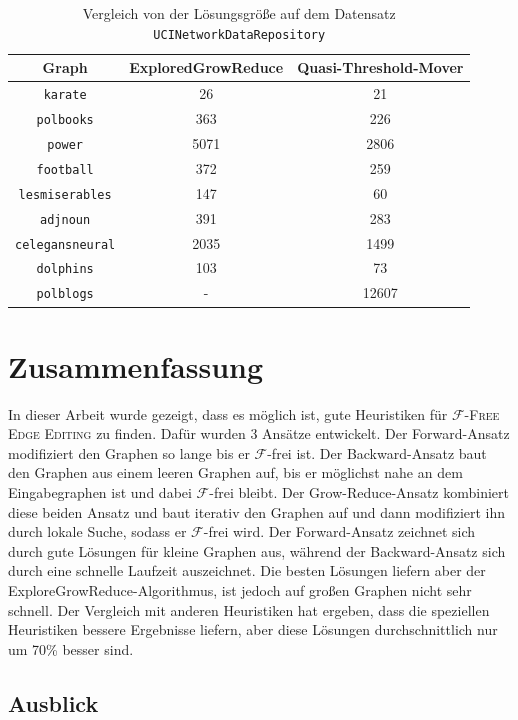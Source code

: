 \documentclass[12pt,a4paper,onecolumn,oneside,titlepage]{article}
\newcommand{\vars}{\texttt}
\newcommand\cursive[1]{\ensuremath{\mathcal{#1}}}
\begin{document}
\begin{table}
\centering
\begin{tabular}{c cc}
Graph & \textbf{ExploredGrowReduce} & \textbf{Quasi-Threshold-Mover} \\ 
\hline 
\vars{karate} & 26 & 21 \\
\vars{polbooks} & 363 & 226 \\
\vars{power} & 5071 & 2806 \\
\vars{football} & 372 & 259 \\
\vars{lesmiserables} & 147 & 60 \\
\vars{adjnoun} & 391 & 283\\
\vars{celegansneural} & 2035 & 1499 \\
\vars{dolphins} & 103 & 73 \\
\vars{polblogs} & - & 12607 \\
\end{tabular} 
\caption{Vergleich von der Lösungsgröße auf dem Datensatz \vars{UCINetworkDataRepository}}
\label{tab:uci}
\end{table}


\section{Zusammenfassung}
In dieser Arbeit wurde gezeigt, dass es möglich ist, gute Heuristiken für \textsc{\cursive{F}-Free Edge Editing} zu finden. Dafür wurden 3 Ansätze entwickelt. Der Forward-Ansatz modifiziert den Graphen so lange bis er \cursive{F}-frei ist. Der Backward-Ansatz baut den Graphen aus einem leeren Graphen auf, bis er möglichst nahe an dem Eingabegraphen ist und dabei \cursive{F}-frei bleibt. Der Grow-Reduce-Ansatz kombiniert diese beiden Ansatz und baut iterativ den Graphen auf und dann modifiziert ihn durch lokale Suche, sodass er \cursive{F}-frei wird. Der Forward-Ansatz zeichnet sich durch gute Lösungen für kleine Graphen aus, während der Backward-Ansatz sich durch eine schnelle Laufzeit auszeichnet. Die besten Lösungen liefern aber der ExploreGrowReduce-Algorithmus, ist jedoch auf großen Graphen nicht sehr schnell.
Der Vergleich mit anderen Heuristiken hat ergeben, dass die speziellen Heuristiken bessere Ergebnisse liefern, aber diese Lösungen durchschnittlich nur um 70\% besser sind.



\subsection{Ausblick}
\end{document}
